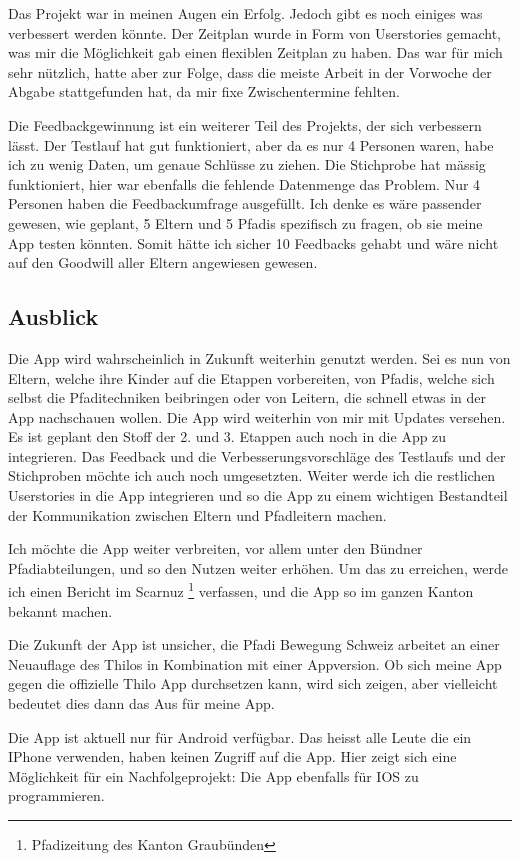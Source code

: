 Das Projekt war in meinen Augen ein Erfolg. Jedoch gibt es noch einiges was verbessert werden könnte. Der Zeitplan wurde in Form von Userstories gemacht, was mir die Möglichkeit gab einen flexiblen Zeitplan zu haben. Das war für mich sehr nützlich, hatte aber zur Folge, dass die meiste Arbeit in der Vorwoche der Abgabe stattgefunden hat, da mir fixe Zwischentermine fehlten. \par
Die Feedbackgewinnung ist ein weiterer Teil des Projekts, der sich verbessern lässt. Der Testlauf hat gut funktioniert, aber da es nur 4 Personen waren, habe ich zu wenig Daten, um genaue Schlüsse zu ziehen. Die Stichprobe hat mässig funktioniert, hier war ebenfalls die fehlende Datenmenge das Problem. Nur 4 Personen haben die Feedbackumfrage ausgefüllt. Ich denke es wäre passender gewesen, wie geplant, 5 Eltern und 5 Pfadis spezifisch zu fragen, ob sie meine App testen könnten. Somit hätte ich sicher 10 Feedbacks gehabt und wäre nicht auf den Goodwill aller Eltern angewiesen gewesen.

\subsection{Ausblick}

Die App wird wahrscheinlich in Zukunft weiterhin genutzt werden. Sei es nun von Eltern, welche ihre Kinder auf die Etappen vorbereiten, von Pfadis, welche sich selbst die Pfaditechniken beibringen oder von Leitern, die schnell etwas in der App nachschauen wollen. Die App wird weiterhin von mir mit Updates versehen. Es ist geplant den Stoff der 2. und 3. Etappen auch noch in die App zu integrieren. Das Feedback und die Verbesserungsvorschläge des Testlaufs und der Stichproben möchte ich auch noch umgesetzten. Weiter werde ich die restlichen Userstories in die App integrieren und so die App zu einem wichtigen Bestandteil der Kommunikation zwischen Eltern und Pfadleitern machen. \par
Ich möchte die App weiter verbreiten, vor allem unter den Bündner Pfadiabteilungen, und so den Nutzen weiter erhöhen. Um das zu erreichen, werde ich einen Bericht im Scarnuz \footnote{Pfadizeitung des Kanton Graubünden} verfassen, und die App so im ganzen Kanton bekannt machen. \par
Die Zukunft der App ist unsicher, die Pfadi Bewegung Schweiz arbeitet an einer Neuauflage des Thilos in Kombination mit einer Appversion. Ob sich meine App gegen die offizielle Thilo App durchsetzen kann, wird sich zeigen, aber vielleicht bedeutet dies dann das Aus für meine App. \par
Die App ist aktuell nur für Android verfügbar. Das heisst alle Leute die ein IPhone verwenden, haben keinen Zugriff auf die App. Hier zeigt sich eine Möglichkeit für ein Nachfolgeprojekt: Die App ebenfalls für IOS zu programmieren. 
